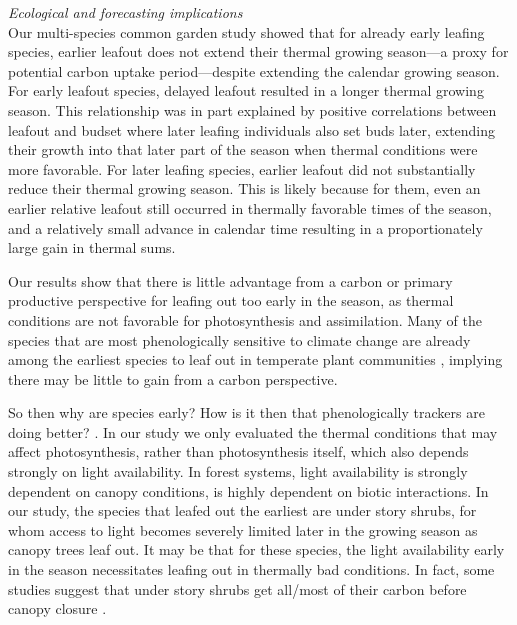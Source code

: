 \documentclass{article}[12pt]
\begin{document}
\emph{Ecological and forecasting implications}\\
Our multi-species common garden study showed that for already early leafing species, earlier leafout does not extend their thermal growing season---a proxy for potential carbon uptake period---despite extending the calendar growing season. For early leafout species, delayed leafout resulted in a longer thermal growing season. This relationship was in part explained by positive correlations between leafout and budset where later leafing individuals also set buds later, extending their growth into that later part of the season when thermal conditions were more favorable.  For later leafing species, earlier leafout did not substantially reduce their thermal growing season. This is likely because for them, even an earlier relative leafout still occurred in thermally favorable times of the season, and a relatively small advance in calendar time resulting in a proportionately large gain in thermal sums.

Our results show that there is little advantage from a carbon or primary productive perspective for leafing out too early in the season, as thermal conditions are not favorable for photosynthesis and assimilation. Many of the species that are most phenologically sensitive to climate change are already among the earliest species to leaf out in temperate plant communities \citep{}, implying there may be little to gain from a carbon perspective.

So then why are species early? How is it then that phenologically trackers are doing better? \citep{}. In our study we only evaluated the thermal conditions that may affect photosynthesis, rather than photosynthesis itself, which also depends strongly on light availability.  In forest systems, light availability is strongly dependent on canopy conditions, is highly dependent on biotic interactions. In our study, the species that leafed out the earliest are under story shrubs, for whom access to light becomes severely limited later in the growing season as canopy trees leaf out. It may be that for these species, the light availability early in the season necessitates leafing out in thermally bad conditions. In fact, some studies suggest that under story shrubs get all/most of their carbon before canopy closure \citep{AUGSPURGER2005}.
\end{document}
